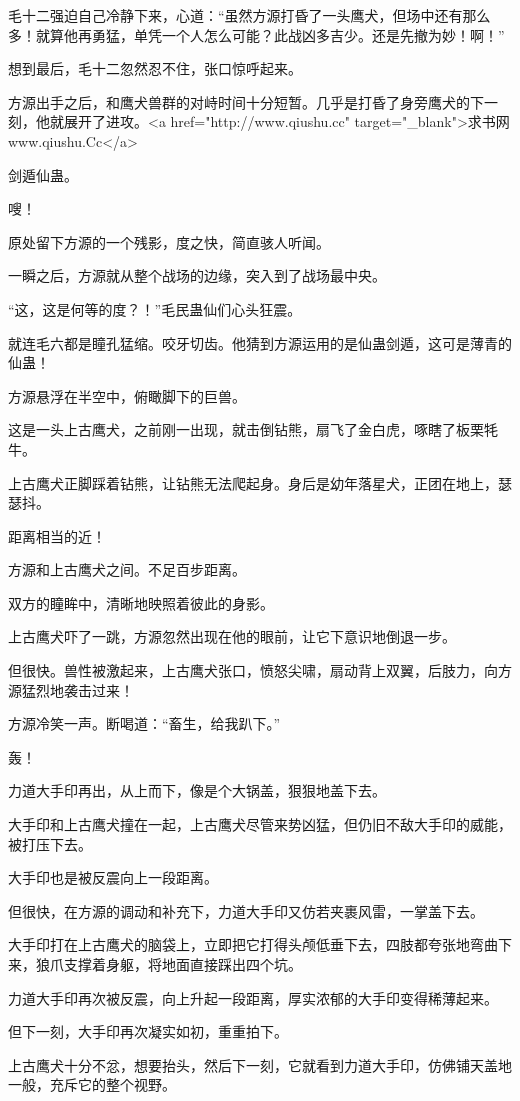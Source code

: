 \begin{this_body}
毛十二强迫自己冷静下来，心道：“虽然方源打昏了一头鹰犬，但场中还有那么多！就算他再勇猛，单凭一个人怎么可能？此战凶多吉少。还是先撤为妙！啊！”

想到最后，毛十二忽然忍不住，张口惊呼起来。

方源出手之后，和鹰犬兽群的对峙时间十分短暂。几乎是打昏了身旁鹰犬的下一刻，他就展开了进攻。<a href="http://www.qiushu.cc" target="\_blank">求书网www.qiushu.Cc</a>

剑遁仙蛊。

嗖！

原处留下方源的一个残影，度之快，简直骇人听闻。

一瞬之后，方源就从整个战场的边缘，突入到了战场最中央。

“这，这是何等的度？！”毛民蛊仙们心头狂震。

就连毛六都是瞳孔猛缩。咬牙切齿。他猜到方源运用的是仙蛊剑遁，这可是薄青的仙蛊！

方源悬浮在半空中，俯瞰脚下的巨兽。

这是一头上古鹰犬，之前刚一出现，就击倒钻熊，扇飞了金白虎，啄瞎了板栗牦牛。

上古鹰犬正脚踩着钻熊，让钻熊无法爬起身。身后是幼年落星犬，正团在地上，瑟瑟抖。

距离相当的近！

方源和上古鹰犬之间。不足百步距离。

双方的瞳眸中，清晰地映照着彼此的身影。

上古鹰犬吓了一跳，方源忽然出现在他的眼前，让它下意识地倒退一步。

但很快。兽性被激起来，上古鹰犬张口，愤怒尖啸，扇动背上双翼，后肢力，向方源猛烈地袭击过来！

方源冷笑一声。断喝道：“畜生，给我趴下。”

轰！

力道大手印再出，从上而下，像是个大锅盖，狠狠地盖下去。

大手印和上古鹰犬撞在一起，上古鹰犬尽管来势凶猛，但仍旧不敌大手印的威能，被打压下去。

大手印也是被反震向上一段距离。

但很快，在方源的调动和补充下，力道大手印又仿若夹裹风雷，一掌盖下去。

大手印打在上古鹰犬的脑袋上，立即把它打得头颅低垂下去，四肢都夸张地弯曲下来，狼爪支撑着身躯，将地面直接踩出四个坑。

力道大手印再次被反震，向上升起一段距离，厚实浓郁的大手印变得稀薄起来。

但下一刻，大手印再次凝实如初，重重拍下。

上古鹰犬十分不忿，想要抬头，然后下一刻，它就看到力道大手印，仿佛铺天盖地一般，充斥它的整个视野。


\end{this_body}
